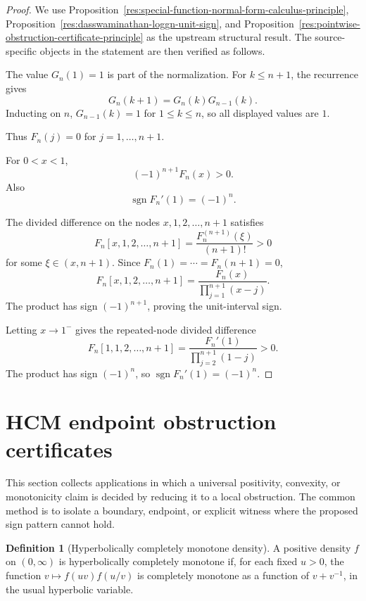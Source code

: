 \documentclass[11pt]{article}
\numberwithin{equation}{section}
\theoremstyle{definition}
\newtheorem{definition}{Definition}[section]
\theoremstyle{remark}
\newcommand{\1}{\mathbf 1}
\begin{document}
\begin{proof}
We use Proposition~\ref{res:special-function-normal-form-calculus-principle}, Proposition~\ref{res:dasswaminathan-loggn-unit-sign}, and Proposition~\ref{res:pointwise-obstruction-certificate-principle} as the upstream structural result. The source-specific objects in the statement are then verified as follows.

The value \(G_n(1)=1\) is part of the normalization. For \(k\le n+1\), the recurrence gives
\[
G_n(k+1)=G_n(k)G_{n-1}(k).
\]
Inducting on \(n\), \(G_{n-1}(k)=1\) for \(1\le k\le n\), so all displayed values are \(1\).

Thus \(F_n(j)=0\) for \(j=1,\dots,n+1\).

For \(0<x<1\),
\[
(-1)^{n+1}F_n(x)>0.
\]
Also
\[
\operatorname{sgn} F_n'(1)=(-1)^n.
\]

The divided difference on the nodes \(x,1,2,\dots,n+1\) satisfies
\[
F_n[x,1,2,\dots,n+1]
=\frac{F_n^{(n+1)}(\xi)}{(n+1)!}>0
\]
for some \(\xi\in(x,n+1)\). Since \(F_n(1)=\cdots=F_n(n+1)=0\),
\[
F_n[x,1,2,\dots,n+1]
=\frac{F_n(x)}{\prod_{j=1}^{n+1}(x-j)}.
\]
The product has sign \((-1)^{n+1}\), proving the unit-interval sign.

Letting \(x\to1^-\) gives the repeated-node divided difference
\[
F_n[1,1,2,\dots,n+1]
=\frac{F_n'(1)}{\prod_{j=2}^{n+1}(1-j)}>0.
\]
The product has sign \((-1)^n\), so \(\operatorname{sgn}F_n'(1)=(-1)^n\).
\end{proof}

\section{HCM endpoint obstruction certificates}
\label{sec:hcm-endpoint-obstruction-certificates}
This section collects applications in which a universal positivity, convexity, or monotonicity claim is decided by reducing it to a local obstruction.  The common method is to isolate a boundary, endpoint, or explicit witness where the proposed sign pattern cannot hold.

\begin{definition}[Hyperbolically completely monotone density]
\label{res:hyperbolically-completely-monotone-language}
A positive density \(f\) on \((0,\infty)\) is hyperbolically completely monotone if, for each fixed \(u>0\), the function \(v\mapsto f(uv)f(u/v)\) is completely monotone as a function of \(v+v^{-1}\), in the usual hyperbolic variable.
\end{definition}
\end{document}
